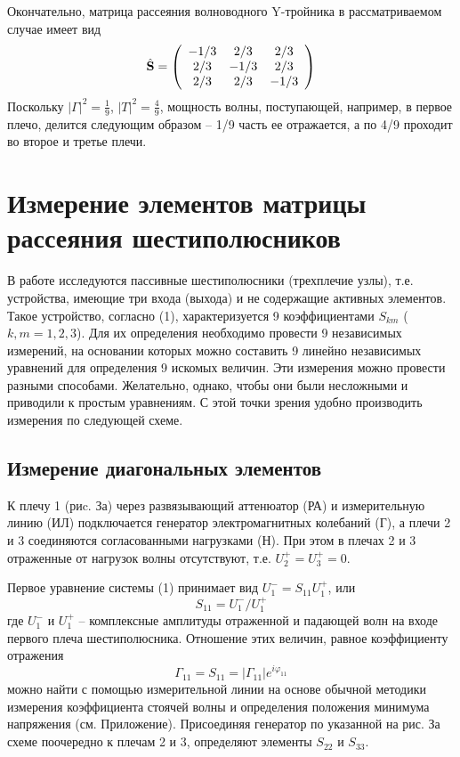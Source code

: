 ﻿\documentclass[a4paper,11pt]{article}
\begin{document}
Окончательно, матрица рассеяния волноводного Y-тройника в рассматриваемом случае имеет вид
\begin{equation}
	\hat { \mathbf { S } } = \left( \begin{array} { c c c } { - 1 / 3 } & { 2 / 3 } & { 2 / 3 } \\ { 2 / 3 } & { - 1 / 3 } & { 2 / 3 } \\ { 2 / 3 } & { 2 / 3 } & { - 1 / 3 } \end{array} \right)
\end{equation}
Поскольку $|\Gamma|^2=\frac19$,  $|T|^2=\frac49$, мощность волны, поступающей, например, в первое плечо, делится следующим образом -- 1/9 часть ее отражается, а по 4/9 проходит во второе и третье плечи.

\section{Измерение элементов матрицы рассеяния шестиполюсников}

В работе исследуются пассивные шестиполюсники (трехплечие узлы), т.е. устройства, имеющие три входа (выхода) и не содержащие активных элементов. 
Такое устройство, согласно (1), характеризуется 9 коэффициентами $S_{km}$ ($k,m=1,2,3$). 
Для их определения необходимо провести 9 независимых измерений, на основании которых можно составить 9 линейно независимых уравнений для определения 9 искомых величин. 
Эти измерения можно провести разными способами. 
Желательно, однако, чтобы они были несложными и приводили к простым уравнениям. 
С этой точки зрения удобно производить измерения по следующей схеме.

\subsection{Измерение диагональных элементов}
К плечу 1 (риc. За) через развязывающий аттенюатор (РА) и измерительную линию (ИЛ) подключается генератор электромагнитных  колебаний (Г), а плечи 2 и 3 соединяются согласованными нагрузками (Н). 
При этом в плечах 2 и 3 отраженные от нагрузок волны отсутствуют, т.е. $U _ { 2 } ^ { + } = U _ { 3 } ^ { + } = 0$.


Первое уравнение системы (1) принимает вид $U_1^-=S_{11}U_1^+$, или
\begin{equation}
	S _ { 11 } = U _ { 1 } ^ { - } / U _ { 1 } ^ { + }
\end{equation}
где $U _ { 1 } ^ { - }$ и $U _ { 1 } ^ { + }$ -- комплексные амплитуды отраженной и падающей волн на входе первого плеча шестиполюсника. Отношение этих величин, равное коэффициенту отражения 
\begin{equation}
	\Gamma _ { 11 } = S _ { 11 } = \left| \Gamma _ { 11 } \right| e ^ { i \varphi _ { 11 } }
\end{equation}
можно найти с помощью измерительной линии на основе обычной методики измерения коэффициента стоячей волны и определения положения минимума напряжения (см. Приложение). 
Присоединяя генератор по указанной на рис. За схеме поочередно к плечам 2 и 3, определяют элементы $S_{22}$ и $S_{33}$.
\end{document}
